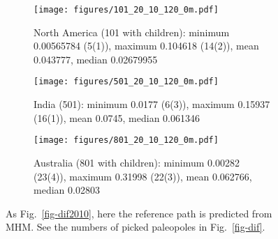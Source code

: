 \begin{figure*}
	\centering
	\begin{subfigure}{1.01\textwidth}
		\texttt{[image: figures/101\_20\_10\_120\_0m.pdf]}
		\caption{North America (101 with children): minimum 0.00565784 (5(1)),
		maximum 0.104618 (14(2)), mean 0.043777, median 0.02679955}\label{fig-na-dif2010m}
	\end{subfigure}
	\vspace{.1em}
	\begin{subfigure}{1.01\textwidth}
		\texttt{[image: figures/501\_20\_10\_120\_0m.pdf]}
		\caption{India (501): minimum 0.0177 (6(3)), maximum 0.15937 (16(1)), mean
		0.0745, median 0.061346}\label{fig-in-dif2010m}
	\end{subfigure}
	\vspace{.1em}
	\begin{subfigure}{1.01\textwidth}
		\texttt{[image: figures/801\_20\_10\_120\_0m.pdf]}
		\caption{Australia (801 with children): minimum 0.00282 (23(4)), maximum
		0.31998 (22(3)), mean 0.062766, median 0.02803}\label{fig-au-dif2010m}
	\end{subfigure}
	\caption[Differences of each plate's paleomagnetic APWPs versus
its MHM predicted APWP]{As Fig.~\ref{fig-dif2010}, here the reference path is
predicted from MHM\@. See the numbers of picked paleopoles in
Fig.~\ref{fig-dif}.}\label{fig-dif2010m}
\end{figure*}

